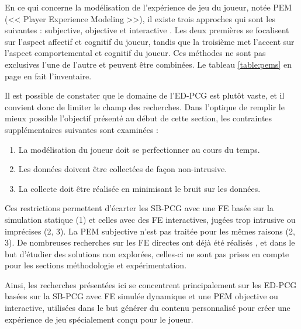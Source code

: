\documentclass[a4paper,11pt]{article}
\begin{document}
      En ce qui concerne la modélisation de l'expérience de jeu du joueur, notée PEM (<< Player Experience Modeling >>), il existe trois approches qui sont les suivantes : subjective, objective et interactive \cite{Yannakakis}.
      Les deux premières se focalisent sur l'aspect affectif et cognitif du joueur, tandis que la troisième met l'accent sur l'aspect comportemental et cognitif du joueur.
      Ces méthodes ne sont pas exclusives l'une de l'autre et peuvent être combinées.      
      Le tableau \ref{table:pems} en page \pageref{table:pems} en fait l'inventaire. 
      
      Il est possible de constater que le domaine de l'ED-PCG est plutôt vaste, et il convient donc de limiter le champ des recherches.
      Dans l'optique de remplir le mieux possible l'objectif présenté au début de cette section, les contraintes supplémentaires suivantes sont examinées :
      
      \begin{enumerate}
        \vspace{-1em}
        \item La modélisation du joueur doit se perfectionner au cours du temps.
        \vspace{-0.8em}
        \item Les données doivent être collectées de façon non-intrusive.
        \vspace{-0.8em}
        \item La collecte doit être réalisée en minimisant le bruit sur les données.
        \vspace{-1em}
      \end{enumerate}

      Ces restrictions permettent d'écarter les SB-PCG avec une FE basée sur la simulation statique (1) et celles avec des FE interactives, jugées trop intrusive ou imprécises (2, 3).
      La PEM subjective n'est pas traitée pour les mêmes raisons (2, 3).
      De nombreuses recherches sur les FE directes ont déjà été réalisés \cite{Agius}, et dans le but d'étudier des solutions non explorées, celles-ci ne sont pas prises en compte pour les sections méthodologie et expérimentation.

      Ainsi, les recherches présentées ici se concentrent principalement sur les ED-PCG basées sur la SB-PCG avec FE simulée dynamique et une PEM objective ou interactive, utilisées dans le but générer du contenu personnalisé pour créer une expérience de jeu spécialement conçu pour le joueur.
\end{document}
